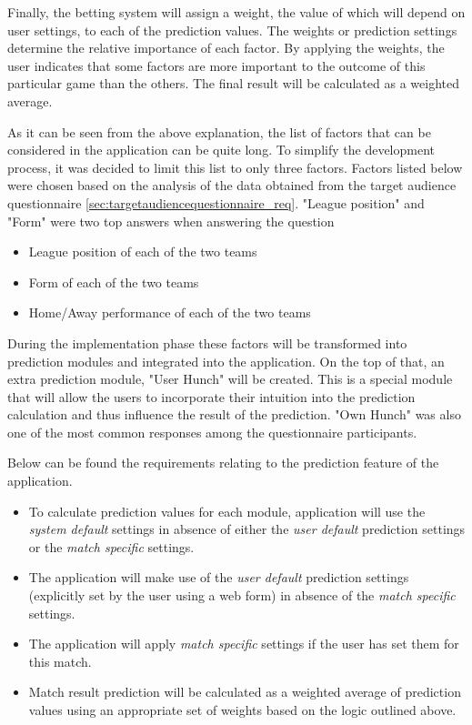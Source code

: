 Finally, the betting system will assign a weight, the value of which will depend on user settings, to each of the prediction values. The weights or prediction settings determine the relative importance of each factor. By applying the weights, the user indicates that some factors are more important to the outcome of this particular game than the others. The final result will be calculated as a weighted average.

As it can be seen from the above explanation, the list of factors that can be considered in the application can be quite long. To simplify the development process, it was decided to limit this list to only three factors. Factors listed below were chosen based on the analysis of the data obtained from the target audience questionnaire \ref{sec:targetaudiencequestionnaire_req}. "League position" and "Form" were two top answers when answering the question

\begin{itemize}
	\item League position of each of the two teams
	\item Form of each of the two teams
	\item Home/Away performance of each of the two teams
\end{itemize}

During the implementation phase these factors will be transformed into prediction modules and integrated into the application. On the top of that, an extra prediction module, "User Hunch" will be created. This is a special module that will allow the users to incorporate their intuition into the prediction calculation and thus influence the result of the prediction. "Own Hunch" was also one of the most common responses among the questionnaire participants.

Below can be found the requirements relating to the prediction feature of the application.

\begin{itemize}
 \item To calculate prediction values for each module, application will use the \emph{system default} settings in absence of either the \emph{user default} prediction settings or the \emph{match specific} settings.
 \item The application will make use of the \emph{user default} prediction settings (explicitly set by the user using a web form) in absence of the \emph{match specific} settings.
 \item The application will apply \emph{match specific} settings if the user has set them for this match.
 \item Match result prediction will be calculated as a weighted average of prediction values using an appropriate set of weights based on the logic outlined above.
\end{itemize}

